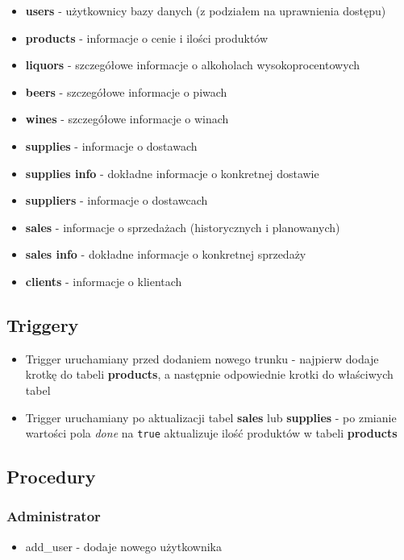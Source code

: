 \documentclass[12pt,a4paper]{article}
\begin{document}
    \begin{itemize}
        \item \textbf{users} - użytkownicy bazy danych (z podziałem na uprawnienia dostępu)
        \item \textbf{products} - informacje o cenie i ilości produktów
        \item \textbf{liquors} - szczegółowe informacje o alkoholach wysokoprocentowych
        \item \textbf{beers} - szczegółowe informacje o piwach
        \item \textbf{wines} - szczegółowe informacje o winach
        \item \textbf{supplies} - informacje o dostawach
        \item \textbf{supplies info} - dokładne informacje o konkretnej dostawie
        \item \textbf{suppliers} - informacje o dostawcach
        \item \textbf{sales} - informacje o sprzedażach (historycznych i planowanych)
        \item \textbf{sales info} - dokładne informacje o konkretnej sprzedaży
        \item \textbf{clients} - informacje o klientach
    \end{itemize}
    
\subsection*{Triggery}

    \begin{itemize}
        \item Trigger uruchamiany przed dodaniem nowego trunku - najpierw dodaje krotkę do tabeli \textbf{products}, a następnie odpowiednie krotki do właściwych tabel
        \item Trigger uruchamiany po aktualizacji tabel \textbf{sales} lub \textbf{supplies} - po zmianie wartości pola \textit{done} na \texttt{true} aktualizuje ilość produktów w tabeli \textbf{products}
    \end{itemize}        

\subsection*{Procedury}

    \subsubsection*{Administrator}
        \begin{itemize}
            \item \textsf{add\_user} - dodaje nowego użytkownika
        \end{itemize}
\end{document}
